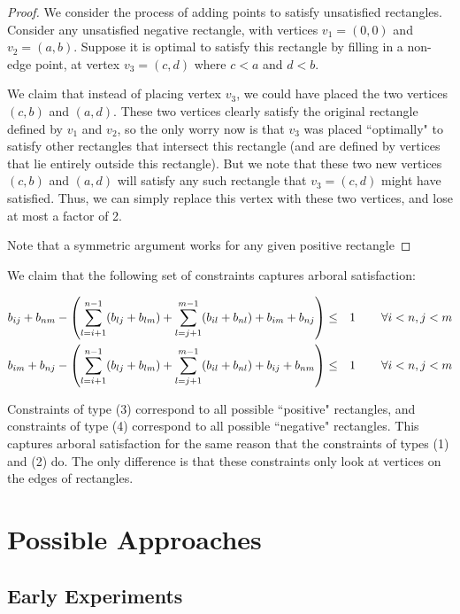 \documentclass[11pt]{article}
\begin{document}
\begin{proof} We consider the process of adding points to satisfy unsatisfied rectangles. Consider any unsatisfied negative rectangle, with vertices $v_1 = (0,0)$ and $v_2 = (a,b)$. Suppose it is optimal to satisfy this rectangle by filling in a non-edge point, at vertex $v_3 = (c,d)$ where $c < a$ and $d< b$.

We claim that instead of placing vertex $v_3$, we could have placed the two vertices $(c,b)$ and $(a,d)$. These two vertices clearly satisfy the original rectangle defined by $v_1$ and $v_2$, so the only worry now is that $v_3$ was placed ``optimally" to satisfy other rectangles that intersect this rectangle (and are defined by vertices that lie entirely outside this rectangle). But we note that these two new vertices $(c,b)$ and $(a,d)$ will satisfy any such rectangle that $v_3 = (c,d)$ might have satisfied. Thus, we can simply replace this vertex with these two vertices, and lose at most a factor of 2.

Note that a symmetric argument works for any given positive rectangle

\end{proof}

We claim that the following set of constraints captures arboral satisfaction: 

\begin{align}
b_{ij} + b_{nm} - \left(\sum_{l=i+1}^{n-1} (b_{lj}+b_{lm}) + \sum_{l=j+1}^{m-1} (b_{il} + b_{nl}) + b_{im} + b_{nj} \right) &\leq& 1 & \hspace{.3in} \forall i<n, j<m \\
b_{im} + b_{nj} - \left(\sum_{l=i+1}^{n-1} (b_{lj}+b_{lm}) + \sum_{l=j+1}^{m-1} (b_{il} + b_{nl}) + b_{ij} + b_{nm} \right) &\leq& 1 & \hspace{.3in} \forall i<n, j<m
\end{align}

Constraints of type (3) correspond to all possible ``positive" rectangles, and constraints of type (4) correspond to all possible ``negative" rectangles. This captures arboral satisfaction for the same reason that the constraints of types (1) and (2) do. The only difference is that these constraints only look at vertices on the edges of rectangles.

\section{Possible Approaches}

\subsection{Early Experiments}
\end{document}
